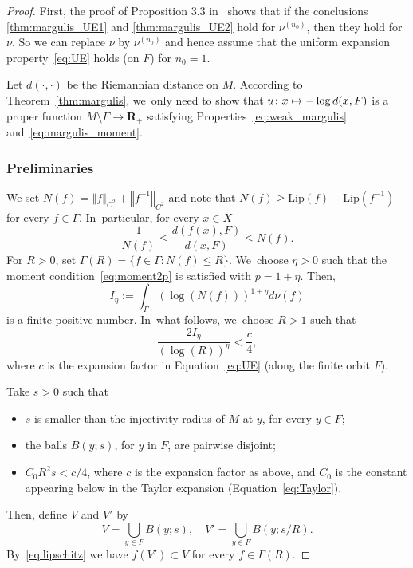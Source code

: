 \documentclass[11pt]{article}
\newcommand\mto{\mathchoice{\longmapsto}{\mapsto}{\mapsto}{\mapsto}}
\let\sep :
\newcommand{\norm}[1]{{\left\Vert#1\right\Vert}}
\newcommand{\inv}{^{-1}}
\def\R{\mathbf{R}}
\newcommand\Lip{\mathrm{Lip}}
\theoremstyle{plain}
\theoremstyle{definition}
\numberwithin{equation}{section}
\begin{document}
\begin{proof}
First, the proof of Proposition 3.3 in~\cite{benard-desaxce} shows that if
the conclusions \eqref{thm:margulis_UE1} and \eqref{thm:margulis_UE2} hold for $\nu^{(n_0)}$, then they hold for $\nu$. So we can replace $\nu$ by $\nu^{(n_0)}$ and hence assume that the uniform expansion property~\eqref{eq:UE} holds (on $F$) for $n_0=1$.

Let $d(\cdot,\cdot)$ be the Riemannian distance on $M$. According to Theorem~\ref{thm:margulis}, we~only need to show that
$u\colon x\mto - \log d(x, F)$ is a
proper function $M\setminus F\to \R_+$ satisfying Properties~\eqref{eq:weak_margulis}
and~\eqref{eq:margulis_moment}.

\subsubsection*{Preliminaries}
We set
$N(f)=\norm{f}_{C^2}+\norm{f\inv}_{C^2}$ and note that $N(f)\geq \Lip(f) + \Lip(f\inv)$ for every $f\in \Gamma$. In~particular, for every $x\in X$
\begin{equation}
\label{eq:lipschitz}
\frac{1}{N(f)} \leq \frac{d (f(x), F)}{d(x,F)} \leq N(f).
\end{equation}
For $R>0$, set $\Gamma(R)=\{f\in \Gamma \sep  N(f) \leq R\}$. We~choose $\eta >0$ such that the moment condition~\eqref{eq:moment2p} is satisfied with $p=1+\eta$. Then,
\begin{equation*}
I_\eta:=\int_{\Gamma} \left(\log(N(f))\right)^{1+\eta} d\nu(f)
\end{equation*}
is a finite positive number. In~what follows, we~choose $R>1$ such that
\begin{equation*}
\frac{2I_\eta}{(\log(R))^\eta}< \frac{c}{4},
\end{equation*}
where $c$ is the expansion factor in Equation~\eqref{eq:UE} (along the finite orbit $F$).

Take $s>0$ such that
\begin{itemize}
\item $s$ is smaller than the injectivity radius of $M$ at $y$, for every $y\in F$;
\item the balls $B(y;s)$, for $y$ in $F$, are pairwise disjoint;
\item $C_0R^2 s < c/4$, where $c$ is the expansion factor as above, and $C_0$ is the constant appearing
below in the Taylor expansion (Equation~\eqref{eq:Taylor}).
\end{itemize}
Then, define $V$ and $V'$ by
\begin{equation*}
V=\bigcup_{y\in F} B(y;s), \quad V' = \bigcup_{y\in F} B(y;s/R).
\end{equation*}
By~\eqref{eq:lipschitz} we have $f(V')\subset V$ for every $f\in \Gamma(R)$.


\end{proof}
\end{document}
